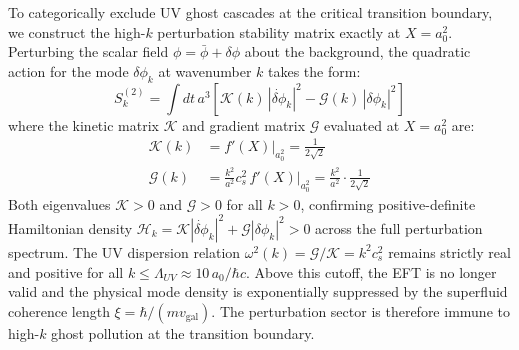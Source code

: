 \documentclass[aps,prd,10pt,twocolumn,superscriptaddress,nofootinbib,floatfix]{revtex4-2}
\begin{document}
To categorically exclude UV ghost cascades at the critical transition boundary, we construct the high-$k$ perturbation stability matrix exactly at $X = a_0^2$. Perturbing the scalar field $\phi = \bar{\phi} + \delta\phi$ about the background, the quadratic action for the mode $\delta\phi_k$ at wavenumber $k$ takes the form:
\begin{equation}
S^{(2)}_k = \int dt\, a^3 \left[ \mathcal{K}(k)\,|\dot{\delta\phi}_k|^2 - \mathcal{G}(k)\,|\delta\phi_k|^2 \right]
\end{equation}
where the kinetic matrix $\mathcal{K}$ and gradient matrix $\mathcal{G}$ evaluated at $X = a_0^2$ are:
\begin{align}
\mathcal{K}(k) &= f'(X)\big|_{a_0^2} = \frac{1}{2\sqrt{2}} \\
\mathcal{G}(k) &= \frac{k^2}{a^2} c_s^2\, f'(X)\big|_{a_0^2} = \frac{k^2}{a^2} \cdot \frac{1}{2\sqrt{2}}
\end{align}
Both eigenvalues $\mathcal{K} > 0$ and $\mathcal{G} > 0$ for all $k > 0$, confirming positive-definite Hamiltonian density $\mathcal{H}_k = \mathcal{K}|\dot{\delta\phi}_k|^2 + \mathcal{G}|\delta\phi_k|^2 > 0$ across the full perturbation spectrum. The UV dispersion relation $\omega^2(k) = \mathcal{G}/\mathcal{K} = k^2 c_s^2$ remains strictly real and positive for all $k \le \Lambda_{UV} \approx 10\,a_0/\hbar c$. Above this cutoff, the EFT is no longer valid and the physical mode density is exponentially suppressed by the superfluid coherence length $\xi = \hbar/(m v_{\text{gal}})$. The perturbation sector is therefore immune to high-$k$ ghost pollution at the transition boundary.
\end{document}
